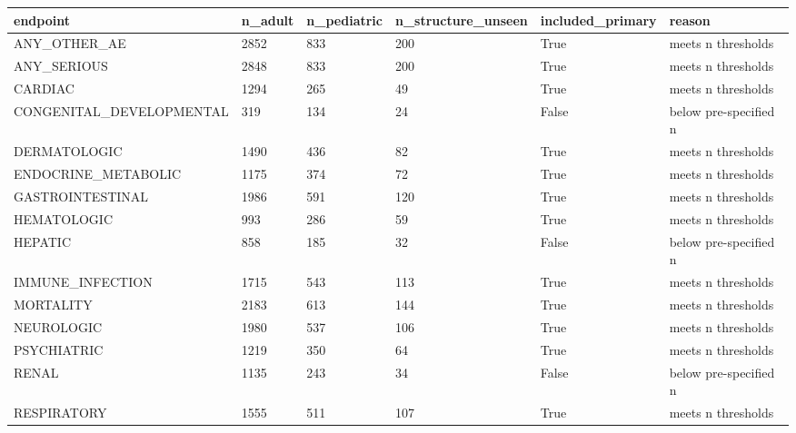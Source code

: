 \begin{tabular}{llllll}
\hline
endpoint & n\_adult & n\_pediatric & n\_structure\_unseen & included\_primary & reason \\
\hline
ANY\_OTHER\_AE & 2852 & 833 & 200 & True & meets n thresholds \\
ANY\_SERIOUS & 2848 & 833 & 200 & True & meets n thresholds \\
CARDIAC & 1294 & 265 & 49 & True & meets n thresholds \\
CONGENITAL\_DEVELOPMENTAL & 319 & 134 & 24 & False & below pre-specified n \\
DERMATOLOGIC & 1490 & 436 & 82 & True & meets n thresholds \\
ENDOCRINE\_METABOLIC & 1175 & 374 & 72 & True & meets n thresholds \\
GASTROINTESTINAL & 1986 & 591 & 120 & True & meets n thresholds \\
HEMATOLOGIC & 993 & 286 & 59 & True & meets n thresholds \\
HEPATIC & 858 & 185 & 32 & False & below pre-specified n \\
IMMUNE\_INFECTION & 1715 & 543 & 113 & True & meets n thresholds \\
MORTALITY & 2183 & 613 & 144 & True & meets n thresholds \\
NEUROLOGIC & 1980 & 537 & 106 & True & meets n thresholds \\
PSYCHIATRIC & 1219 & 350 & 64 & True & meets n thresholds \\
RENAL & 1135 & 243 & 34 & False & below pre-specified n \\
RESPIRATORY & 1555 & 511 & 107 & True & meets n thresholds \\
\hline
\end{tabular}
